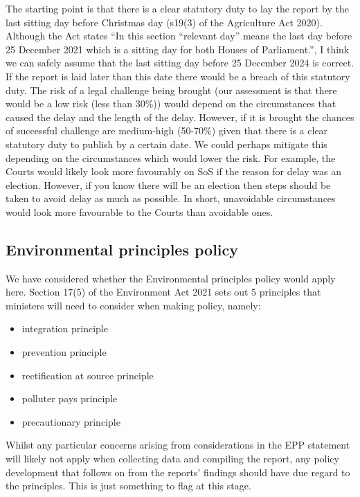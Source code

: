 \documentclass[
]{book}
\providecommand{\tightlist}{%
  \setlength{\itemsep}{0pt}\setlength{\parskip}{0pt}}
\begin{document}
The starting point is that there is a clear statutory duty to lay the report by the last sitting day before Christmas day (s19(3) of the Agriculture Act 2020). Although the Act states ``In this section ``relevant day'' means the last day before 25 December 2021 which is a sitting day for both Houses of Parliament.'', I think we can safely assume that the last sitting day before 25 December 2024 is correct. If the report is laid later than this date there would be a breach of this statutory duty. The risk of a legal challenge being brought (our assessment is that there would be a low risk (less than 30\%)) would depend on the circumstances that caused the delay and the length of the delay. However, if it is brought the chances of successful challenge are medium-high (50-70\%) given that there is a clear statutory duty to publish by a certain date. We could perhaps mitigate this depending on the circumstances which would lower the risk. For example, the Courts would likely look more favourably on SoS if the reason for delay was an election. However, if you know there will be an election then steps should be taken to avoid delay as much as possible. In short, unavoidable circumstances would look more favourable to the Courts than avoidable ones.

\hypertarget{environmental-principles-policy}{%
\subsection{Environmental principles policy}\label{environmental-principles-policy}}

We have considered whether the Environmental principles policy would apply here. Section 17(5) of the Environment Act 2021 sets out 5 principles that ministers will need to consider when making policy, namely:

\begin{itemize}
\tightlist
\item
  integration principle
\item
  prevention principle
\item
  rectification at source principle
\item
  polluter pays principle
\item
  precautionary principle
\end{itemize}

Whilst any particular concerns arising from considerations in the EPP statement will likely not apply when collecting data and compiling the report, any policy development that follows on from the reports' findings should have due regard to the principles. This is just something to flag at this stage.
\end{document}
